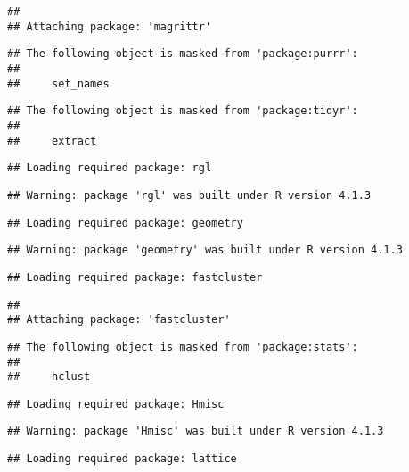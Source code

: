 \documentclass[
]{article}
\begin{document}
\begin{verbatim}
## 
## Attaching package: 'magrittr'
\end{verbatim}

\begin{verbatim}
## The following object is masked from 'package:purrr':
## 
##     set_names
\end{verbatim}

\begin{verbatim}
## The following object is masked from 'package:tidyr':
## 
##     extract
\end{verbatim}

\begin{verbatim}
## Loading required package: rgl
\end{verbatim}

\begin{verbatim}
## Warning: package 'rgl' was built under R version 4.1.3
\end{verbatim}

\begin{verbatim}
## Loading required package: geometry
\end{verbatim}

\begin{verbatim}
## Warning: package 'geometry' was built under R version 4.1.3
\end{verbatim}

\begin{verbatim}
## Loading required package: fastcluster
\end{verbatim}

\begin{verbatim}
## 
## Attaching package: 'fastcluster'
\end{verbatim}

\begin{verbatim}
## The following object is masked from 'package:stats':
## 
##     hclust
\end{verbatim}

\begin{verbatim}
## Loading required package: Hmisc
\end{verbatim}

\begin{verbatim}
## Warning: package 'Hmisc' was built under R version 4.1.3
\end{verbatim}

\begin{verbatim}
## Loading required package: lattice
\end{verbatim}
\end{document}

